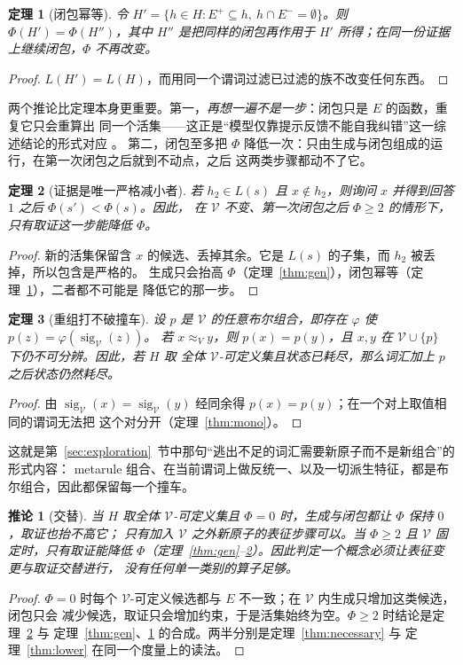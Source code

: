 \documentclass[11pt]{ctexart}
\newtheorem{theorem}{定理}
\newtheorem{corollary}{推论}
\newcommand{\sig}{\operatorname{sig}}
\newcommand{\Indist}{\approx_{V}}
\newcommand{\Vocab}{\mathcal{V}}
\newcommand{\Epos}{E^{+}}
\newcommand{\Eneg}{E^{-}}
\begin{document}
\begin{theorem}[闭包幂等]\label{thm:clos}
令 $H'=\{h\in H:\Epos\subseteq h,\ h\cap\Eneg=\emptyset\}$。则 $\Phi(H')=\Phi(H'')$，其中 $H''$
是把同样的闭包再作用于 $H'$ 所得；在同一份证据上继续闭包，$\Phi$ 不再改变。
\end{theorem}
\begin{proof}
$L(H')=L(H)$，而用同一个谓词过滤已过滤的族不改变任何东西。
\end{proof}

两个推论比定理本身更重要。第一，\emph{再想一遍不是一步}：闭包只是 $E$ 的函数，重复它只会重算出
同一个活集——这正是“模型仅靠提示反馈不能自我纠错”这一综述结论的形式对应 \cite{kamoi2024}。
第二，闭包至多把 $\Phi$ 降低一次：只由生成与闭包组成的运行，在第一次闭包之后就到不动点，之后
这两类步骤都动不了它。

\begin{theorem}[证据是唯一严格减小者]\label{thm:ev}
若 $h_2\in L(s)$ 且 $x\notin h_2$，则询问 $x$ 并得到回答 $1$ 之后 $\Phi(s')<\Phi(s)$。因此，
在 $\Vocab$ 不变、第一次闭包之后 $\Phi\ge 2$ 的情形下，只有取证这一步能降低 $\Phi$。
\end{theorem}
\begin{proof}
新的活集保留含 $x$ 的候选、丢掉其余。它是 $L(s)$ 的子集，而 $h_2$ 被丢掉，所以包含是严格的。
生成只会抬高 $\Phi$（定理~\ref{thm:gen}），闭包幂等（定理~\ref{thm:clos}），二者都不可能是
降低它的那一步。
\end{proof}

\begin{theorem}[重组打不破撞车]\label{thm:recomb}
设 $p$ 是 $\Vocab$ 的任意布尔组合，即存在 $\varphi$ 使 $p(z)=\varphi(\sig_{\Vocab}(z))$。
若 $x\Indist y$，则 $p(x)=p(y)$，且 $x,y$ 在 $\Vocab\cup\{p\}$ 下仍不可分辨。因此，若 $H$ 取
全体 $\Vocab$-可定义集且状态已耗尽，那么词汇加上 $p$ 之后状态仍然耗尽。
\end{theorem}
\begin{proof}
由 $\sig_{\Vocab}(x)=\sig_{\Vocab}(y)$ 经同余得 $p(x)=p(y)$；在一个对上取值相同的谓词无法把
这个对分开（定理~\ref{thm:mono}）。
\end{proof}

这就是第~\ref{sec:exploration}~节中那句“逃出不足的词汇需要新原子而不是新组合”的形式内容：
metarule 组合、在当前谓词上做反统一、以及一切派生特征，都是布尔组合，因此都保留每一个撞车。

\begin{corollary}[交替]\label{cor:alt}
当 $H$ 取全体 $\Vocab$-可定义集且 $\Phi=0$ 时，生成与闭包都让 $\Phi$ 保持 $0$，取证也抬不高它；
只有加入 $\Vocab$ 之外新原子的表征步骤可以。当 $\Phi\ge 2$ 且 $\Vocab$ 固定时，只有取证能降低
$\Phi$（定理~\ref{thm:gen}--\ref{thm:ev}）。因此判定一个概念必须让表征变更与取证交替进行，
没有任何单一类别的算子足够。
\end{corollary}
\begin{proof}
$\Phi=0$ 时每个 $\Vocab$-可定义候选都与 $E$ 不一致；在 $\Vocab$ 内生成只增加这类候选，闭包只会
减少候选，取证只会增加约束，于是活集始终为空。$\Phi\ge2$ 时结论是定理~\ref{thm:ev} 与
定理~\ref{thm:gen}、\ref{thm:clos} 的合成。两半分别是定理~\ref{thm:necessary} 与
定理~\ref{thm:lower} 在同一个度量上的读法。
\end{proof}
\end{document}
